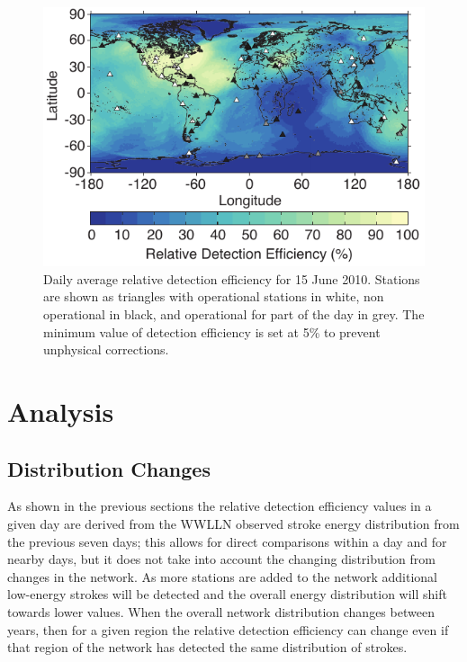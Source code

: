 \begin{figure}[ht!]
   \centering
\noindent\includegraphics[scale=1]{efficiency/Figures/2012RS005049-p7.pdf}
   \caption{Daily average relative detection efficiency for 15 June 2010.
Stations are shown as triangles with operational stations in white, non operational in black, and operational for part of the day in grey.
The minimum value of detection efficiency is set at 5\% to prevent unphysical corrections.}
   \label{efficiency:fig:Daily_Map}
\end{figure}

\section{Analysis}

\subsection{Distribution Changes}

As shown in the previous sections the relative detection efficiency values in a given day are derived from the WWLLN observed stroke energy distribution from the previous seven days; this allows for direct comparisons within a day and for nearby days, but it does not take into account the changing distribution from changes in the network.
As more stations are added to the network additional low-energy strokes will be detected and the overall energy distribution will shift towards lower values.
When the overall network distribution changes between years, then for a given region the relative detection efficiency can change even if that region of the network has detected the same distribution of strokes.

